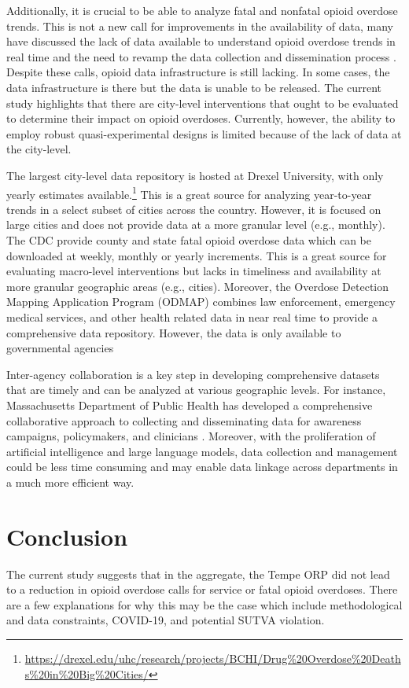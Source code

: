 Additionally, it is crucial to be able to analyze fatal and nonfatal opioid overdose trends. This is not a new call for improvements in the availability of data, many have discussed the lack of data available to understand opioid overdose trends in real time and the need to revamp the data collection and dissemination process \parencite{blanco_data_2022, volkow_need_2022}. Despite these calls, opioid data infrastructure is still lacking. In some cases, the data infrastructure is there but the data is unable to be released. The current study highlights that there are city-level interventions that ought to be evaluated to determine their impact on opioid overdoses. Currently, however, the ability to employ robust quasi-experimental designs is limited because of the lack of data at the city-level. 

The largest city-level data repository is hosted at Drexel University, with only yearly estimates available.\footnote{\url{https://drexel.edu/uhc/research/projects/BCHI/Drug\%20Overdose\%20Deaths\%20in\%20Big\%20Cities/}} This is a great source for analyzing year-to-year trends in a select subset of cities across the country. However, it is focused on large cities and does not provide data at a more granular level (e.g., monthly). The CDC provide county and state fatal opioid overdose data which can be downloaded at weekly, monthly or yearly increments. This is a great source for evaluating macro-level interventions but lacks in timeliness and availability at more granular geographic areas (e.g., cities). Moreover, the Overdose Detection Mapping Application Program (ODMAP) combines law enforcement, emergency medical services, and other health related data in near real time to provide a comprehensive data repository. However, the data is only available to governmental agencies \parencite{blanco_data_2022}

Inter-agency collaboration is a key step in developing comprehensive datasets that are timely and can be analyzed at various geographic levels. For instance, Massachusetts Department of Public Health has developed a comprehensive collaborative approach to collecting and disseminating data for awareness campaigns, policymakers, and clinicians \parencite{bharel_using_2020}. Moreover, with the proliferation of artificial intelligence and large language models, data collection and management could be less time consuming and may enable data linkage across departments in a much more efficient way. 

\section{\centering Conclusion}
The current study suggests that in the aggregate, the Tempe ORP did not lead to a reduction in opioid overdose calls for service or fatal opioid overdoses. There are a few explanations for why this may be the case which include methodological and data constraints, COVID-19, and potential SUTVA violation. 


